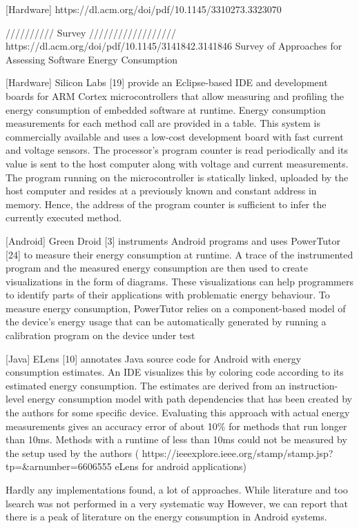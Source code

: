 \documentclass[../thesis.tex]{subfiles}
\begin{document}
[Hardware]
https://dl.acm.org/doi/pdf/10.1145/3310273.3323070

////////// Survey //////////////////
https://dl.acm.org/doi/pdf/10.1145/3141842.3141846
Survey of Approaches for Assessing Software Energy Consumption

[Hardware] Silicon Labs [19] provide an Eclipse-based IDE and development boards for ARM Cortex microcontrollers that allow measuring and profiling the energy consumption of embedded software at runtime. Energy consumption measurements for each method call are provided in a table. This system is commercially available and uses a low-cost development
board with fast current and voltage sensors. The processor’s program counter is read periodically and its value is sent to the host computer along with voltage and current
measurements. The program running on the microcontroller is statically linked, uploaded by the host computer and resides at a previously known and constant address in memory. Hence, the address of the program counter is sufficient to infer the currently executed method.

[Android] Green Droid [3] instruments Android programs and uses PowerTutor [24] to measure their energy consumption at runtime. A trace of the instrumented program and the measured energy consumption are then used to create visualizations in the form of diagrams. These visualizations can help programmers to identify parts of their applications with problematic energy behaviour. To measure energy consumption, PowerTutor relies on a component-based model of the device’s energy usage that can be automatically generated by running a calibration program on the device under test 

[Java] ELens [10] annotates Java source code for Android with energy consumption estimates. An IDE visualizes this by coloring code according to its estimated energy consumption. The estimates are derived from an instruction-level energy consumption model with path dependencies that has been created by the authors for some specific device.  Evaluating this approach with actual energy measurements gives an accuracy error of about 10\% for methods that run longer than 10ms. Methods with a runtime of less than 10ms could not be measured by the setup used by the authors ( https://ieeexplore.ieee.org/stamp/stamp.jsp?tp=&arnumber=6606555 eLens for android applications)

Hardly any implementations found, a lot of approaches. While literature and too lsearch was not performed in a very systematic way
However, we can report that there is a peak of literature on the energy consumption in Android systems. 
\end{document}
